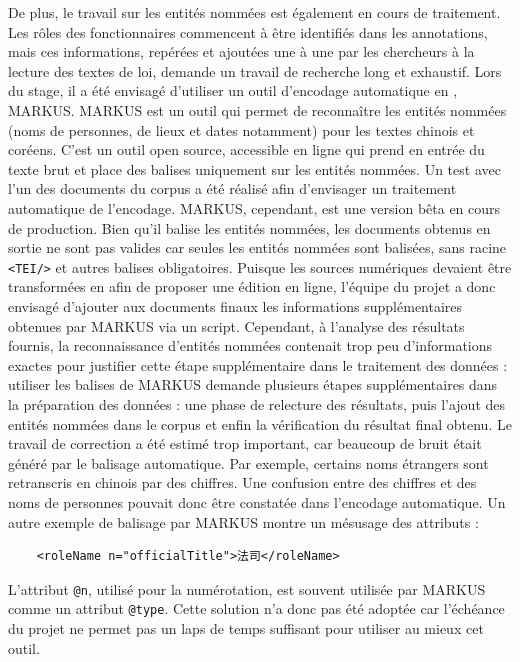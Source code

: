De plus, le travail sur les entités nommées est également en cours de traitement. Les rôles des fonctionnaires commencent à être identifiés dans les annotations, mais ces informations, repérées et ajoutées une à une par les chercheurs à la lecture des textes de loi, demande un travail de recherche long et exhaustif. Lors du stage, il a été envisagé d'utiliser un outil d'encodage automatique en \TEI, MARKUS. MARKUS est un outil qui permet de reconnaître les entités nommées (noms de personnes, de lieux et dates notamment) pour les textes chinois et coréens. C'est un outil open source, accessible en ligne qui prend en entrée du texte brut et place des balises \TEI uniquement sur les entités nommées. Un test avec l'un des documents du corpus a été réalisé afin d'envisager un traitement automatique de l'encodage. MARKUS, cependant, est une version bêta en cours de production. Bien qu'il balise les entités nommées, les documents \TEI obtenus en sortie ne sont pas valides car seules les entités nommées sont balisées, sans racine \texttt{<TEI/>} et autres balises obligatoires. Puisque les sources numériques devaient être transformées en \TEI afin de proposer une édition en ligne, l'équipe du projet a donc envisagé d'ajouter aux documents \TEI finaux les informations supplémentaires obtenues par MARKUS via un script. Cependant, à l'analyse des résultats fournis, la reconnaissance d'entités nommées contenait trop peu d'informations exactes pour justifier cette étape supplémentaire dans le traitement des données : utiliser les balises de MARKUS demande plusieurs étapes supplémentaires dans la préparation des données : une phase de relecture des résultats, puis l'ajout des entités nommées dans le corpus \TEI et enfin la vérification du résultat final obtenu. Le travail de correction a été estimé trop important, car beaucoup de bruit était généré par le balisage automatique. Par exemple, certains noms étrangers sont retranscris en chinois par des chiffres. Une confusion entre des chiffres et des noms de personnes pouvait donc être constatée dans l'encodage automatique. Un autre exemple de balisage par MARKUS montre un mésusage des attributs \TEI : 

\begin{verbatim}
    <roleName n="officialTitle">法司</roleName>
\end{verbatim}

L'attribut \texttt{@n}, utilisé pour la numérotation, est souvent utilisée par MARKUS comme un attribut \texttt{@type}. Cette solution n'a donc pas été adoptée car l'échéance du projet ne permet pas un laps de temps suffisant pour utiliser au mieux cet outil. 

